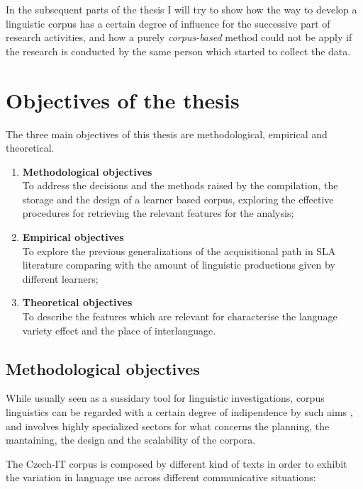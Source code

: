 \documentclass[
  a4paper,
  twoside,
  12pt,
  chapterprefix=false,
  bibliography=totocnumbered,
  listof=flat]{scrbook}
\providecommand{\tightlist}{%
  \setlength{\itemsep}{0pt}\setlength{\parskip}{0pt}}
\begin{document}
In the subsequent parts of the thesis I will try to show how the way to develop a linguistic corpus has a certain degree of influence for the successive part of research activities, and how a purely \emph{corpus-based} method could not be apply if the research is conducted by the same person which started to collect the data.

\hypertarget{objectives-of-the-thesis}{%
\section{Objectives of the thesis}\label{objectives-of-the-thesis}}

The three main objectives of this thesis are methodological, empirical and theoretical.

\begin{enumerate}
\def\labelenumi{\arabic{enumi}.}
\tightlist
\item
  \textbf{Methodological objectives}\\
  To address the decisions and the methods raised by the compilation, the storage and the design of a learner based corpus, exploring the effective procedures for retrieving the relevant features for the analysis;
\item
  \textbf{Empirical objectives}\\
  To explore the previous generalizations of the acquisitional path in SLA literature comparing with the amount of linguistic productions given by different learners;
\item
  \textbf{Theoretical objectives}\\
  To describe the features which are relevant for characterise the language variety effect and the place of interlanguage.
\end{enumerate}

\hypertarget{methodological-objectives}{%
\subsection{Methodological objectives}\label{methodological-objectives}}

While usually seen as a sussidary tool for linguistic investigations, corpus linguistics can be regarded with a certain degree of indipendence by such aims \citep{sinclair2005, sinclairCarter2004}, and involves highly specialized sectors for what concerns the planning, the mantaining, the design and the scalability of the corpora.

The Czech-IT corpus is composed by different kind of texts in order to exhibit the variation in language use across different communicative situations:
\end{document}
